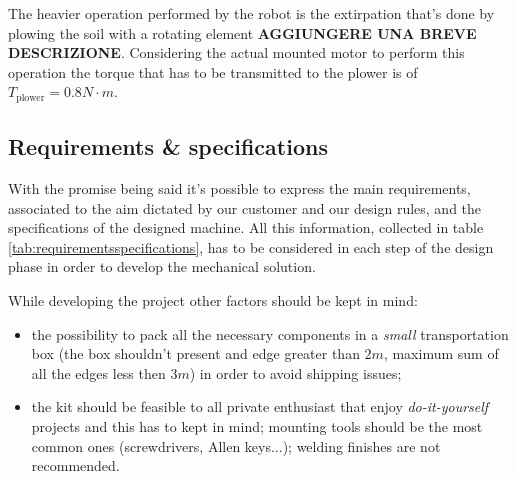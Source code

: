 	The heavier operation performed by the robot is the extirpation that's done by plowing the soil with a rotating element \textbf{AGGIUNGERE UNA BREVE DESCRIZIONE}. Considering the actual mounted motor to perform this operation the torque that has to be transmitted to the plower is of $T_\textrm{plower} = 0.8 N\cdot m$.

	
	\subsection{Requirements \& specifications}
		With the promise being said it's possible to express the main requirements, associated to the aim dictated by our customer and our design rules, and the specifications of the designed machine. All this information, collected in table \ref{tab:requirementsspecifications}, has to be considered in each step of the design phase in order to develop the mechanical solution.
		
		
		
		While developing the project other factors should be kept in mind:
		\begin{itemize}
			\item the possibility to pack all the necessary components in a \textit{small} transportation box (the box shouldn't present and edge greater than $2m$, maximum sum of all the edges less then $3m$) in order to avoid shipping issues;
			
			\item the kit should be feasible to all private enthusiast that enjoy \textit{do-it-yourself} projects and this has to kept in mind; mounting tools should be the most common ones (screwdrivers, Allen keys...); welding finishes are not recommended.
		\end{itemize}
	
	
	
	
	
	
	
	
	
	
	
	
	
	
	
	
	
	
	
	
	
	
	
	